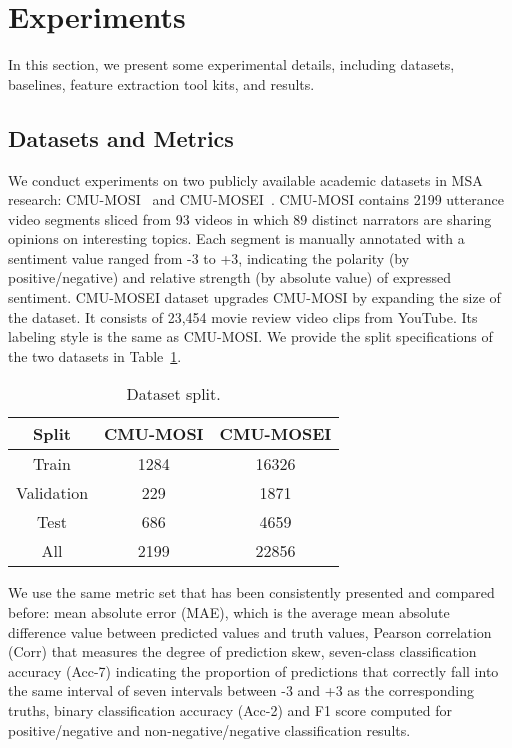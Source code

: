 \documentclass[11pt]{article}
\begin{document}
 \section{Experiments}
In this section, we present some experimental details, including datasets, baselines, feature extraction tool kits, and results.

\subsection{Datasets and Metrics}
We conduct experiments on two publicly available academic datasets in MSA research:  CMU-MOSI~\citep{zadeh2016multimodal} and CMU-MOSEI~\citep{zadeh2018multimodal}. 
CMU-MOSI contains 2199 utterance video segments sliced from 93 videos in which 89 distinct narrators are sharing opinions on interesting topics.
Each segment is manually annotated with a sentiment value ranged from -3 to +3, indicating the polarity (by positive/negative) and relative strength (by absolute value) of expressed sentiment. 
CMU-MOSEI dataset upgrades CMU-MOSI by expanding the size of the dataset. 
It consists of 23,454 movie review video clips from YouTube. 
Its labeling style is the same as CMU-MOSI.
We provide the split specifications of the two datasets in Table~\ref{Dataset Specification}.
\begin{table}
    \centering
\begin{tabular}{ccc}
        \hline
        Split & CMU-MOSI & CMU-MOSEI \\
        \hline
         Train & 1284 & 16326 \\
         Validation & 229 & 1871 \\
         Test & 686 & 4659 \\
         \hdashline
         All & 2199 & 22856 \\
         \hline
    \end{tabular}
    \caption{Dataset split.}
    \label{Dataset Specification}
\end{table} \par
We use the same metric set that has been consistently presented and compared before: mean absolute error (MAE), which is the average mean absolute difference value between predicted values and truth values, Pearson correlation (Corr) that measures the degree of prediction skew, seven-class classification accuracy (Acc-7) indicating the proportion of predictions that correctly fall into the same interval of seven intervals between -3 and +3 as the corresponding truths, binary classification accuracy (Acc-2) and F1 score computed for positive/negative and non-negative/negative classification results.
\end{document}
